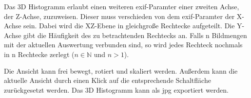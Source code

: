 \begin{description}
			\begin{figure}[H]
				\centering
			\end{figure}
			Das 3D Histogramm erlaubt einen weiteren \gls{exif}-Paramter einer zweiten Achse, der Z-Achse, zuzuweisen. Dieser muss verschieden von dem \gls{exif}-Paramter der X-Achse sein.
			Dabei wird die XZ-Ebene in gleichgroße Rechtecke aufgeteilt. Die Y-Achse gibt die Häufigkeit des zu betrachtenden Rechtecks an. Falls n Bildmengen mit der aktuellen Auswertung verbunden sind, so wird jedes Rechteck nochmals in n Rechtecke zerlegt ($ n \in \mathbb{N} $ und $ n>1 $). \par
			
			Die Ansicht kann frei bewegt, rotiert und skaliert werden. Außerdem kann die aktuelle Ansicht durch einen Klick auf die entsprechende Schaltfläche zurückgesetzt werden. Das 3D Histogramm kann als \gls{jpg} exportiert werden.


\end{description}
